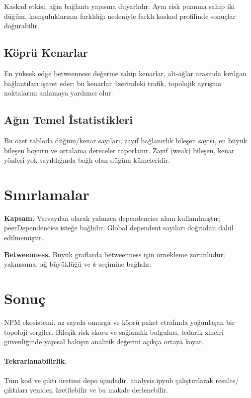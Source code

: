 \documentclass[11pt,a4paper]{article}
\begin{document}
\noindent Kaskad etkisi, ağın bağlantı yapısına duyarlıdır: Aynı risk puanına sahip iki düğüm, komşuluklarının farklılığı nedeniyle farklı kaskad profilinde sonuçlar doğurabilir.

\subsection{Köprü Kenarlar}
\noindent En yüksek edge betweenness değerine sahip kenarlar, alt-ağlar arasında kırılgan bağlantıları işaret eder; bu kenarlar üzerindeki trafik, topolojik ayrışma noktalarını anlamaya yardımcı olur.

\subsection{Ağın Temel İstatistikleri}

\noindent Bu özet tabloda düğüm/kenar sayıları, zayıf bağlanırlık bileşen sayısı, en büyük bileşen boyutu ve ortalama dereceler raporlanır. Zayıf (weak) bileşen, kenar yönleri yok sayıldığında bağlı olan düğüm kümeleridir.

\section{Sınırlamalar}
\textbf{Kapsam.} Varsayılan olarak yalnızca dependencies alanı kullanılmıştır; peerDependencies isteğe bağlıdır. Global dependent sayıları doğrudan dahil edilmemiştir.

\textbf{Betweenness.} Büyük graflarda betweenness için örnekleme zorunludur; yakınsama, ağ büyüklüğü ve $k$ seçimine bağlıdır.

\section{Sonuç}
NPM ekosistemi, az sayıda omurga ve köprü paket etrafında yoğunlaşan bir topoloji sergiler. Bileşik risk skoru ve sağlamlık bulguları, tedarik zinciri güvenliğinde yapısal bakışın analitik değerini açıkça ortaya koyar.

\paragraph{Tekrarlanabilirlik.} Tüm kod ve çıktı üretimi depo içindedir. analysis.ipynb çalıştırılarak results/ çıktıları yeniden üretilebilir ve bu makale derlenebilir.
\end{document}
